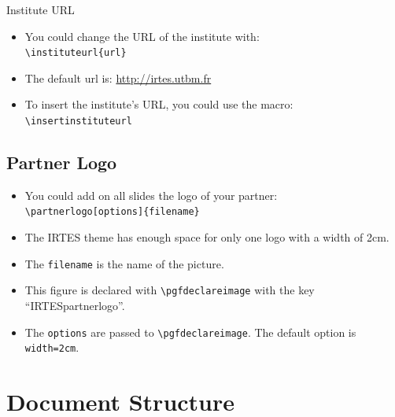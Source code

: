\documentclass[english,circlenumberstyle]{irtesbeamer}
\begin{document}
\begin{frame}{Institute URL}
	\begin{itemize}
	\item You could change the URL of the institute with: \\
		\texttt{{\textbackslash}instituteurl\{url\}}
	\item The default url is: \url{http://irtes.utbm.fr}
	\item To insert the institute's URL, you could use the macro: \\
			\texttt{{\textbackslash}insertinstituteurl}
	\end{itemize}
\end{frame}

\subsection{Partner Logo}
\begin{frame}{\subsecname}
	\begin{itemize}
	\item You could add on all slides the logo of your partner: \\
		\texttt{{\textbackslash}partnerlogo[options]\{filename\}}
	\item The IRTES theme has enough space for only one logo with a width of 2cm.
	\item The \texttt{filename} is the name of the picture.
	\item This figure is declared with \texttt{{\textbackslash}pgfdeclareimage} with the key ``IRTESpartnerlogo''.
	\item The \texttt{options} are passed to \texttt{{\textbackslash}pgfdeclareimage}. The default option is \texttt{width=2cm}.
	\end{itemize}
\end{frame}

\section{Document Structure}
\end{document}
